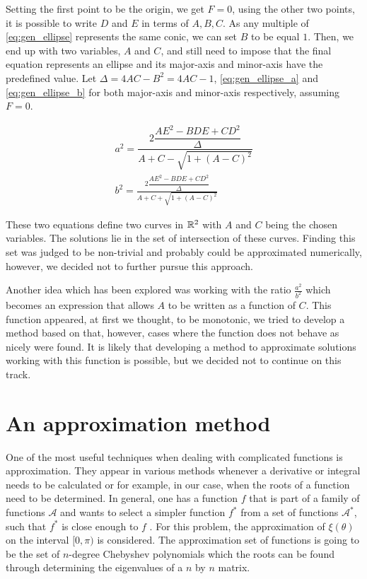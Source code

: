 Setting the first point to be the origin, we get $F=0$, using the other two points, it is possible to write $D$ and $E$ in terms of $A, B, C$. As any multiple of \autoref{eq:gen_ellipse} represents the same conic, we can set $B$ to be equal $1$. Then, we end up with two variables, $A$ and $C$, and still need to impose that the final equation represents an ellipse and its major-axis and minor-axis have the predefined value. Let $\Delta=4AC-B^2=4AC-1$, \autoref{eq:gen_ellipse_a} and \autoref{eq:gen_ellipse_b} for both major-axis and minor-axis respectively, assuming $F=0$.

\begin{align}\label{eq:gen_ellipse_a}
a^2 = \dfrac{2\dfrac{AE^2 -BDE +CD^2}{\Delta}}{A + C - \sqrt{1 + (A-C)^2}}\\
\label{eq:gen_ellipse_b}b^2 = \frac{2\dfrac{AE^2 -BDE +CD^2}{\Delta}}{A + C + \sqrt{1 + (A-C)^2}}
\end{align}

These two equations define two curves in $\mathbb{R}^2$ with $A$ and $C$ being the chosen variables. The solutions lie in the set of intersection of these curves. Finding this set was judged to be non-trivial and probably could be approximated numerically, however, we decided not to further pursue this approach.

Another idea which has been explored was working with the ratio $\frac{a^2}{b^2}$ which becomes an expression that allows $A$ to be written as a function of $C$. This function appeared, at first we thought, to be monotonic, we tried to develop a method based on that, however, cases where the function does not behave as nicely were found. It is likely that developing a method to approximate solutions working with this function is possible, but we decided not to continue on this track.


\section{An approximation method}

One of the most useful techniques when dealing with complicated functions is approximation. They appear in various methods whenever a derivative or integral needs to be calculated or for example, in our case, when the roots of a function need to be determined. In general, one has a function $f$ that is part of a family of functions $\mathcal{A}$ and wants to select a simpler function $f^*$ from a set of functions $\mathcal{A^*}$, such that $f^*$ is close enough to $f$ \cite[p.~3]{powell}. For this problem, the approximation of $\xi(\theta)$ on the interval $[0, \pi)$ is considered. The approximation set of functions is going to be the set of $n$-degree Chebyshev polynomials which the roots can be found through determining the eigenvalues of a $n$ by $n$ matrix.


